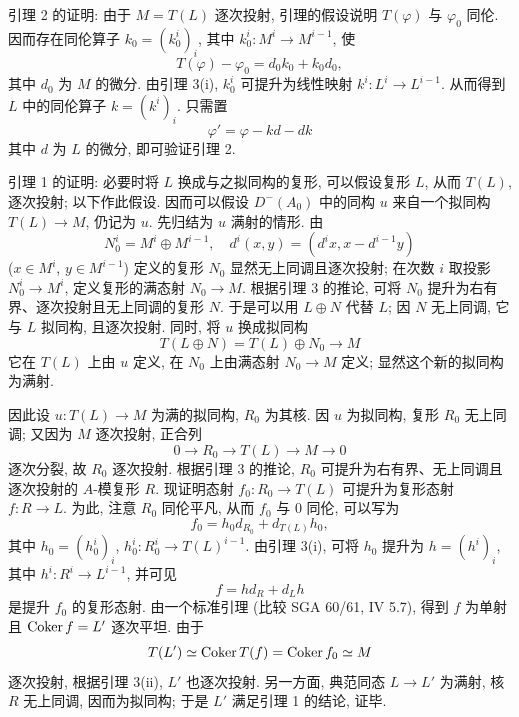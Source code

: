 引理 2 的证明: 由于 $M=T(L)$ 逐次投射, 引理的假设说明 $T(\varphi)$ 与 $\varphi_0$ 同伦. 因而存在同伦算子 $k_0=(k_0^i)_i$, 其中 $k_0^i:M^i\to M^{i-1}$, 使
\[
T(\varphi)-\varphi_0=d_0k_0+k_0d_0,
\]
其中 $d_0$ 为 $M$ 的微分. 由引理 3(i), $k_0^i$ 可提升为线性映射 $k^i:L^i\to L^{i-1}$. 从而得到 $L$ 中的同伦算子 $k=(k^i)_i$. 只需置
\[
\varphi'=\varphi-kd-dk
\]
其中 $d$ 为 $L$ 的微分, 即可验证引理 2.

引理 1 的证明: 必要时将 $L$ 换成与之拟同构的复形, 可以假设复形 $L$, 从而 $T(L)$, 逐次投射; 以下作此假设. 因而可以假设 $D^-(A_0)$ 中的同构 $u$ 来自一个拟同构 $T(L)\to M$, 仍记为 $u$. 先归结为 $u$ 满射的情形. 由
\[
N_0^i=M^i\oplus M^{i-1},
\quad
 d^i(x,y)=(d^i x,x-d^{i-1}y)
\]
($x\in M^i$, $y\in M^{i-1}$) 定义的复形 $N_0$ 显然无上同调且逐次投射; 在次数 $i$ 取投影 $N_0^i\to M^i$, 定义复形的满态射 $N_0\to M$. 根据引理 3 的推论, 可将 $N_0$ 提升为右有界、逐次投射且无上同调的复形 $N$. 于是可以用 $L\oplus N$ 代替 $L$; 因 $N$ 无上同调, 它与 $L$ 拟同构, 且逐次投射. 同时, 将 $u$ 换成拟同构
\[
T(L\oplus N)=T(L)\oplus N_0\longrightarrow M
\]
它在 $T(L)$ 上由 $u$ 定义, 在 $N_0$ 上由满态射 $N_0\to M$ 定义; 显然这个新的拟同构为满射.

因此设 $u:T(L)\to M$ 为满的拟同构, $R_0$ 为其核. 因 $u$ 为拟同构, 复形 $R_0$ 无上同调; 又因为 $M$ 逐次投射, 正合列
\[
0\longrightarrow R_0\longrightarrow T(L)\longrightarrow M\longrightarrow0
\]
逐次分裂, 故 $R_0$ 逐次投射. 根据引理 3 的推论, $R_0$ 可提升为右有界、无上同调且逐次投射的 $A$-模复形 $R$. 现证明态射 $f_0:R_0\to T(L)$ 可提升为复形态射 $f:R\to L$. 为此, 注意 $R_0$ 同伦平凡, 从而 $f_0$ 与 $0$ 同伦, 可以写为
\[
f_0=h_0d_{R_0}+d_{T(L)}h_0,
\]
其中 $h_0=(h_0^i)_i$, $h_0^i:R_0^i\to T(L)^{i-1}$. 由引理 3(i), 可将 $h_0$ 提升为 $h=(h^i)_i$, 其中 $h^i:R^i\to L^{i-1}$, 并可见
\[
f=hd_R+d_Lh
\]
是提升 $f_0$ 的复形态射. 由一个标准引理 (比较 SGA 60/61, IV 5.7), 得到 $f$ 为单射且 $\operatorname{Coker} f=L'$ 逐次平坦. 由于
\[
T(L')\simeq\operatorname{Coker} T(f)=\operatorname{Coker} f_0\simeq M
\]
逐次投射, 根据引理 3(ii), $L'$ 也逐次投射. 另一方面, 典范同态 $L\to L'$ 为满射, 核 $R$ 无上同调, 因而为拟同构; 于是 $L'$ 满足引理 1 的结论, 证毕.

